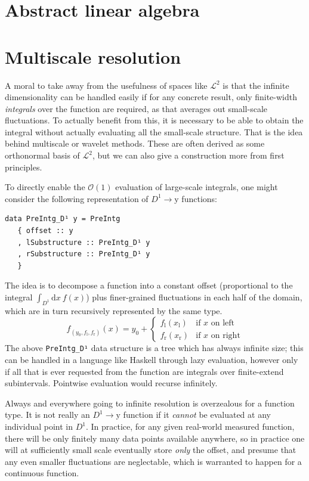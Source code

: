 \documentclass[sigplan,review,anonymous]{acmart}\settopmatter{printfolios=true,printccs=false,printacmref=false}
\begin{document}
\section{Abstract linear algebra}

\section{Multiscale resolution}\label{mulScaleResoIntro}
A moral to take away from the usefulness of spaces like $\mathcal{L}^2$ is that the infinite dimensionality can be handled easily if for any concrete result, only finite-width \emph{integrals} over the function are required, as that averages out small-scale fluctuations. To actually benefit from this, it is necessary to be able to obtain the integral without actually evaluating all the small-scale structure. That is the idea behind multiscale or wavelet methods. These are often derived as some orthonormal basis of $\mathcal{L}^2$, but we can also give a construction more from first principles.

To directly enable the $\mathcal{O}(1)$ evaluation of large-scale integrals, one might consider the following representation of $D^1\to \mathrm{y}$ functions:
\begin{lstlisting}
data PreIntg_D¹ y = PreIntg
   { offset :: y
   , lSubstructure :: PreIntg_D¹ y
   , rSubstructure :: PreIntg_D¹ y
   }
\end{lstlisting}
The idea is to decompose a function into a constant offset (proportional to the integral $\int_{D^1}\!\mathrm{d}x\:f(x)$) plus finer-grained fluctuations in each half of the domain, which are in turn recursively represented by the same type.
\[
  f_{(y_0,f_\mathrm{l},f_\mathrm{r})}(x)
      = y_0 + \begin{cases}
                 f_\mathrm{l}(x_\mathrm{l}) & \text{if $x$ on left}
              \\ f_\mathrm{r}(x_\mathrm{r}) & \text{if $x$ on right}
              \end{cases}
\]
The above \lstinline`PreIntg_D¹` data structure is a tree which has always infinite size; this can be handled in a language like Haskell through lazy evaluation, however only if all that is ever requested from the function are integrals over finite-extend subintervals. Pointwise evaluation would recurse infinitely.

Always and everywhere going to infinite resolution is overzealous for a function type. It is not really an $D^1\to \mathrm{y}$ function if it \emph{cannot} be evaluated at any individual point in $D^1$. In practice, for any given real-world measured function, there will be only finitely many data points available anywhere, so in practice one will at sufficiently small scale eventually store \emph{only} the offset, and presume that any even smaller fluctuations are neglectable, which is warranted to happen for a continuous function.
\end{document}
